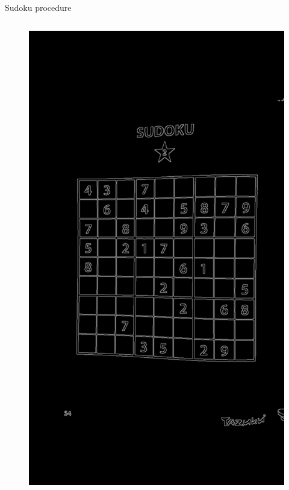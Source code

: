 \documentclass[12pt]{beamer}
\begin{document}
\begin{frame}{Sudoku procedure}
\begin{columns}
{\begin{figure}
            \includegraphics[width=\textwidth]{resources/png/sudoku_00018_02.png}
        \end{figure}
    }
\end{columns}
\end{frame}
\end{document}
